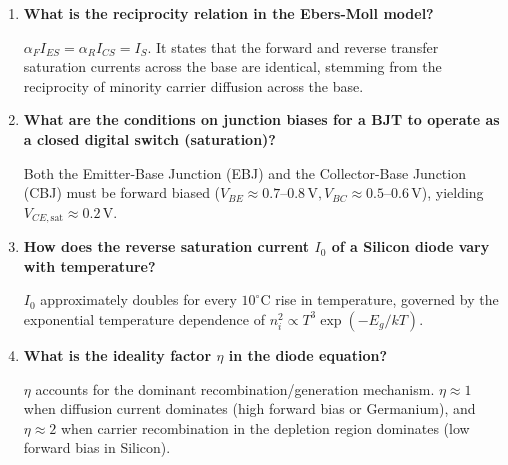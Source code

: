 \documentclass[12pt,a4paper]{article}
\newcommand{\Q}[1]{\textbf{#1}\par\noindent\ignorespaces}
\begin{document}
\begin{tcolorbox}[exambox, title={\textbf{Frequently Asked / Viva Questions}}]
\begin{enumerate}[topsep=0pt, label=\textbf{Q\arabic*.}, itemsep=5pt]
    Increasing $V_{CB}$ widens the collector-base depletion layer, which shrinks the effective neutral base width $W_{\text{eff}}$. This increases the base minority concentration gradient, reduces base recombination, and causes collector current $I_C$ to rise with $V_{CE}$.
  \item \Q{What is the reciprocity relation in the Ebers-Moll model?}
    $\alpha_F I_{ES} = \alpha_R I_{CS} = I_S$. It states that the forward and reverse transfer saturation currents across the base are identical, stemming from the reciprocity of minority carrier diffusion across the base.
  \item \Q{What are the conditions on junction biases for a BJT to operate as a closed digital switch (saturation)?}
    Both the Emitter-Base Junction (EBJ) and the Collector-Base Junction (CBJ) must be forward biased ($V_{BE} \approx 0.7\text{--}0.8\,\text{V}, V_{BC} \approx 0.5\text{--}0.6\,\text{V}$), yielding $V_{CE,\text{sat}} \approx 0.2\,\text{V}$.
  \item \Q{How does the reverse saturation current $I_0$ of a Silicon diode vary with temperature?}
    $I_0$ approximately doubles for every $10^\circ\text{C}$ rise in temperature, governed by the exponential temperature dependence of $n_i^2 \propto T^3 \exp(-E_g / kT)$.
  \item \Q{What is the ideality factor $\eta$ in the diode equation?}
    $\eta$ accounts for the dominant recombination/generation mechanism. $\eta \approx 1$ when diffusion current dominates (high forward bias or Germanium), and $\eta \approx 2$ when carrier recombination in the depletion region dominates (low forward bias in Silicon).
\end{enumerate}
\end{tcolorbox}
\end{document}
